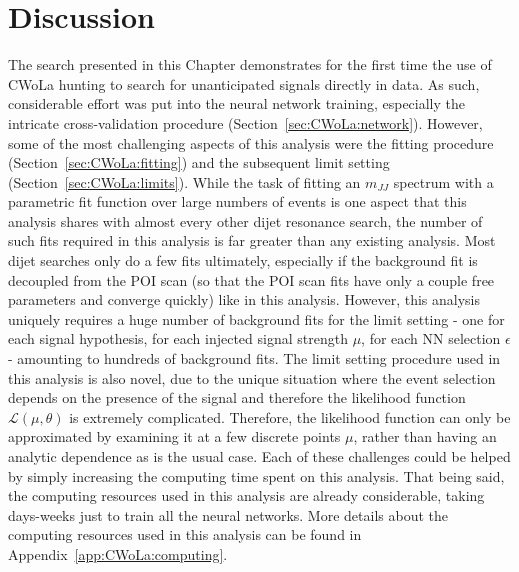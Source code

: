\section{Discussion}
\label{sec:CWoLa:discussion}
The search presented in this Chapter demonstrates for the first time the use of CWoLa hunting to search for unanticipated signals directly in data.
As such, considerable effort was put into the neural network training, especially the intricate cross-validation procedure (Section~\ref{sec:CWoLa:network}).
However, some of the most challenging aspects of this analysis were the fitting procedure (Section~\ref{sec:CWoLa:fitting}) and the subsequent limit setting (Section~\ref{sec:CWoLa:limits}).
While the task of fitting an $m_{JJ}$ spectrum with a parametric fit function over large numbers of events is one aspect that this analysis shares with almost every other dijet resonance search, the number of such fits required in this analysis is far greater than any existing analysis.
Most dijet searches only do a few fits ultimately, especially if the background fit is decoupled from the POI scan (so that the POI scan fits have only a couple free parameters and converge quickly) like in this analysis.
However, this analysis uniquely requires a huge number of background fits for the limit setting - one for each signal hypothesis, for each injected signal strength $\mu$, for each NN selection $\epsilon$ - amounting to hundreds of background fits.
The limit setting procedure used in this analysis is also novel, due to the unique situation where the event selection depends on the presence of the signal and therefore the likelihood function $\mathcal{L}(\mu,\theta)$ is extremely complicated.
Therefore, the likelihood function can only be approximated by examining it at a few discrete points $\mu$, rather than having an analytic dependence as is the usual case.
Each of these challenges could be helped by simply increasing the computing time spent on this analysis.
That being said, the computing resources used in this analysis are already considerable, taking days-weeks just to train all the neural networks.
More details about the computing resources used in this analysis can be found in Appendix~\ref{app:CWoLa:computing}.

